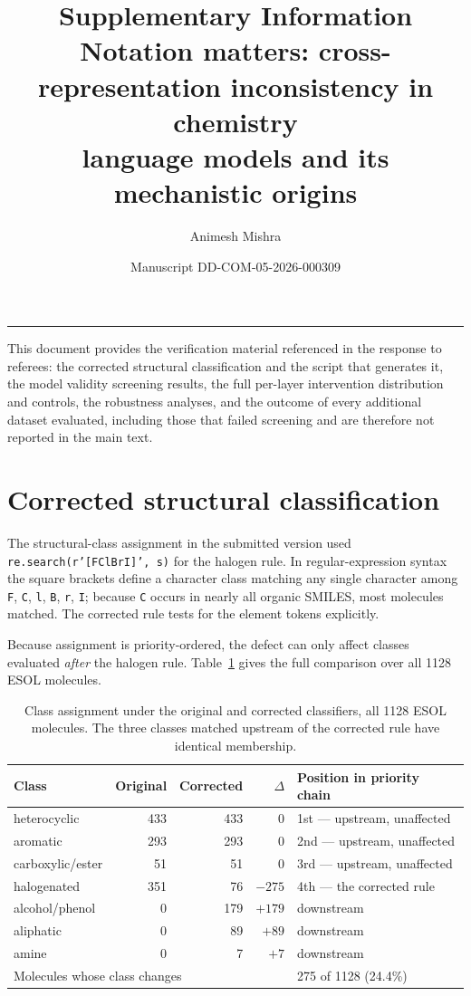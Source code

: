 \documentclass[11pt,a4paper]{article}
\title{\vspace{-1.5cm}\large\textbf{Supplementary Information}\\[4pt]
\normalsize Notation matters: cross-representation inconsistency in chemistry\\
language models and its mechanistic origins}
\author{\normalsize Animesh Mishra}
\date{\small Manuscript DD-COM-05-2026-000309}
\begin{document}
\maketitle
\vspace{-0.6cm}
\noindent\rule{\textwidth}{0.5pt}

\noindent This document provides the verification material referenced in the response to referees: the
corrected structural classification and the script that generates it, the model validity screening
results, the full per-layer intervention distribution and controls, the robustness analyses, and the
outcome of every additional dataset evaluated, including those that failed screening and are therefore
not reported in the main text.

\section{Corrected structural classification}

The structural-class assignment in the submitted version used
\texttt{re.search(r'[FClBrI]', s)} for the halogen rule. In regular-expression syntax the square
brackets define a character class matching any single character among \texttt{F}, \texttt{C},
\texttt{l}, \texttt{B}, \texttt{r}, \texttt{I}; because \texttt{C} occurs in nearly all organic
SMILES, most molecules matched. The corrected rule tests for the element tokens explicitly.

Because assignment is priority-ordered, the defect can only affect classes evaluated \emph{after}
the halogen rule. Table~\ref{tab:cls} gives the full comparison over all 1128 ESOL molecules.

\begin{table}[h]
\centering
\caption{Class assignment under the original and corrected classifiers, all 1128 ESOL molecules.
The three classes matched upstream of the corrected rule have identical membership.}
\label{tab:cls}
\small
\begin{tabular}{lrrrl}
\toprule
Class & Original & Corrected & $\Delta$ & Position in priority chain \\
\midrule
heterocyclic      & 433 & 433 & $0$    & 1st --- upstream, unaffected \\
aromatic          & 293 & 293 & $0$    & 2nd --- upstream, unaffected \\
carboxylic/ester  &  51 &  51 & $0$    & 3rd --- upstream, unaffected \\
halogenated       & 351 &  76 & $-275$ & 4th --- the corrected rule \\
alcohol/phenol    &   0 & 179 & $+179$ & downstream \\
aliphatic         &   0 &  89 & $+89$  & downstream \\
amine             &   0 &   7 & $+7$   & downstream \\
\midrule
\multicolumn{4}{l}{Molecules whose class changes} & 275 of 1128 (24.4\%) \\
\bottomrule
\end{tabular}
\end{table}
\end{document}
